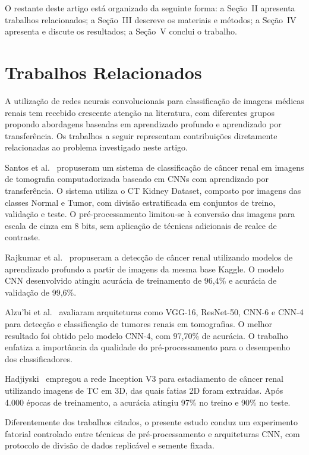 \documentclass[conference]{IEEEtran}
\begin{document}
O restante deste artigo está organizado da seguinte forma: a Seção~II
apresenta trabalhos relacionados; a Seção~III descreve os materiais e métodos;
a Seção~IV apresenta e discute os resultados; a Seção~V conclui o trabalho.

\section{Trabalhos Relacionados}

A utilização de redes neurais convolucionais para classificação de imagens
médicas renais tem recebido crescente atenção na literatura, com diferentes
grupos propondo abordagens baseadas em aprendizado profundo e aprendizado por
transferência. Os trabalhos a seguir representam contribuições diretamente
relacionadas ao problema investigado neste artigo.

Santos et al.~\cite{santos2025} propuseram um sistema de classificação de
câncer renal em imagens de tomografia computadorizada baseado em CNNs com
aprendizado por transferência. O sistema utiliza o CT Kidney Dataset, composto
por imagens das classes Normal e Tumor, com divisão estratificada em conjuntos
de treino, validação e teste. O pré-processamento limitou-se à conversão das
imagens para escala de cinza em 8 bits, sem aplicação de técnicas adicionais
de realce de contraste.

Rajkumar et al.~\cite{rajkumar2023} propuseram a detecção de câncer renal
utilizando modelos de aprendizado profundo a partir de imagens da mesma base
Kaggle. O modelo CNN desenvolvido atingiu acurácia de treinamento de 96,4\%
e acurácia de validação de 99,6\%.

Alzu'bi et al.~\cite{alzubi2022} avaliaram arquiteturas como VGG-16,
ResNet-50, CNN-6 e CNN-4 para detecção e classificação de tumores renais em
tomografias. O melhor resultado foi obtido pelo modelo CNN-4, com 97,70\% de
acurácia. O trabalho enfatiza a importância da qualidade do pré-processamento
para o desempenho dos classificadores.

Hadjiyski~\cite{hadjiyski2020} empregou a rede Inception V3 para estadiamento
de câncer renal utilizando imagens de TC em 3D, das quais fatias 2D foram
extraídas. Após 4.000 épocas de treinamento, a acurácia atingiu 97\% no
treino e 90\% no teste.

Diferentemente dos trabalhos citados, o presente estudo conduz um experimento
fatorial controlado entre técnicas de pré-processamento e arquiteturas CNN,
com protocolo de divisão de dados replicável e semente fixada.
\end{document}
